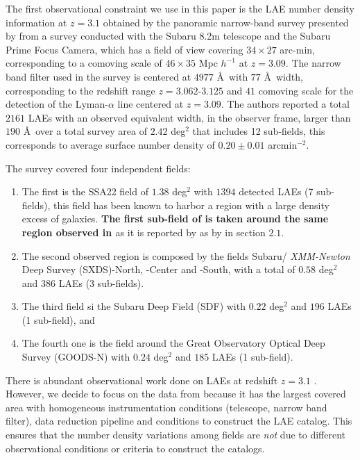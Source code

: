 \documentclass[usenatbib]{mn2e}
\newcommand{\hMpc}{{\ifmmode{h^{-1}{\rm Mpc}}\else{$h^{-1}$Mpc }\fi}}
\begin{document}
The first observational constraint we use in this paper is the LAE number
density information at $z=3.1$ obtained by the panoramic narrow-band
survey presented by \cite{Yamada2012} from a survey
conducted with the Subaru 8.2m telescope and the Subaru Prime Focus Camera,
which has a field of view covering $34\times 27$ arc-min, corresponding to a
comoving scale of $46\times35$ Mpc $h^{-1}$ at $z=3.09$.  The narrow
band filter used in the survey is centered at $4977$ \AA~with  $77$ \AA~width,
corresponding to the redshift range $z=3.062$-$3.125$ and $41$ \hMpc comoving scale for the detection of the Lyman-$\alpha$ line
centered at $z=3.09$. The authors reported a total  $2161$  LAEs with
an observed equivalent width, in the observer frame, larger than $190$
\AA~over a total survey area of $2.42$ deg$^{2}$ that includes 12
sub-fields,  this corresponds to average surface number density of
$0.20\pm 0.01$ arcmin$^{-2}$.  

The survey covered four independent fields:

\begin{enumerate}
\item The first is the SSA22
field of $1.38$ deg$^2$ with $1394$ detected LAEs (7 sub-fields), this
field has been known to harbor a region with a large density excess of
galaxies. {\bf The first sub-field of is taken around the same region
  observed in \cite{Hayashino2004} } as it is reported  by as by
\cite{Yamada2012} in section $2.1$. 

\item The second observed region is composed by the fields Subaru/{\it
  XMM-Newton} Deep Survey (SXDS)-North, -Center and -South, with a
total of $0.58$ deg$^2$ and $386$ LAEs (3 sub-fields).

\item The third  field si the Subaru Deep Field (SDF) with $0.22$ deg$^2$ and
$196$ LAEs (1 sub-field), and 

\item The fourth one is the field around the Great Observatory
Optical Deep Survey  (GOODS-N) with $0.24$ deg$^2$ and $185$ LAEs (1
sub-field).  
\end{enumerate}
   

There is abundant observational work done on LAEs at redshift $z=3.1$
\citep{Kudritzki2000,Matsuda2005,Gawiser2007,Nilsson2007,Ouchi2008}.
However, we decide to focus on the data from \cite{Yamada2012} because
it has the largest covered area with homogeneous instrumentation
conditions (telescope, narrow band filter), data reduction pipeline
and conditions to construct the LAE catalog. This ensures that the
number density variations among fields are \emph{not} due to different
observational conditions or criteria to construct the catalogs.
\end{document}
